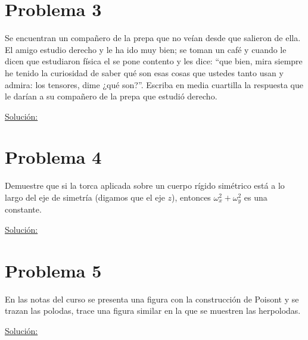 \documentclass[a4paper,10pt]{article}
\numberwithin{equation}{section}
\begin{document}
\section{Problema 3}

Se encuentran un compañero de la prepa que no veían desde que salieron de ella. El 
amigo estudio derecho y le ha ido muy bien; se toman un café y cuando le dicen que 
estudiaron física el se pone contento y les dice: ``que bien, mira siempre he tenido
la curiosidad de saber qué son esas cosas que ustedes tanto usan y admira: los 
tensores, dime ¿qué son?''. Escriba en media cuartilla la respuesta que le darían 
a su compañero de la prepa que estudió derecho.

\vspace{.3cm}

\underline{Solución:} \vspace{.3cm}

\section{Problema 4}

Demuestre que si la torca aplicada sobre un cuerpo rígido simétrico está a lo largo 
del eje de simetría (digamos que el eje $z$), entonces $\omega_x^2 + \omega_y^2$ es 
una constante.

\vspace{.3cm}

\underline{Solución:} \vspace{.3cm}

\section{Problema 5}

En las notas del curso se presenta una figura con la construcción de Poisont y se 
trazan las polodas, trace una figura similar en la que se muestren las herpolodas.

\vspace{.3cm}

\underline{Solución:} \vspace{.3cm}
\end{document}
